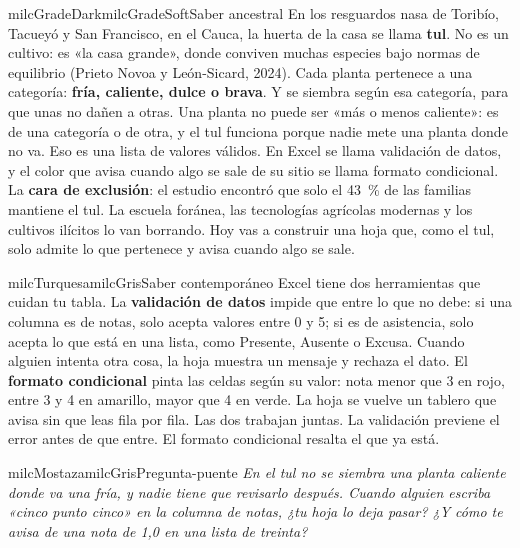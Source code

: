 \documentclass[11pt,letterpaper]{article}
\begin{document}
\begin{softbox}{milcGradeDark}{milcGradeSoft}{Saber ancestral}
En los resguardos nasa de Toribío, Tacueyó y San Francisco, en el Cauca, la huerta de la casa se llama \textbf{tul}. No es un cultivo: es «la casa grande», donde conviven muchas especies bajo normas de equilibrio (Prieto Novoa y León-Sicard, 2024). Cada planta pertenece a una categoría: \textbf{fría, caliente, dulce o brava}. Y se siembra según esa categoría, para que unas no dañen a otras. Una planta no puede ser «más o menos caliente»: es de una categoría o de otra, y el tul funciona porque nadie mete una planta donde no va. Eso es una lista de valores válidos. En Excel se llama validación de datos, y el color que avisa cuando algo se sale de su sitio se llama formato condicional. La \textbf{cara de exclusión}: el estudio encontró que solo el 43~\% de las familias mantiene el tul. La escuela foránea, las tecnologías agrícolas modernas y los cultivos ilícitos lo van borrando. Hoy vas a construir una hoja que, como el tul, solo admite lo que pertenece y avisa cuando algo se sale.\par{}
\end{softbox}

\begin{softbox}{milcTurquesa}{milcGris}{Saber contemporáneo}
Excel tiene dos herramientas que cuidan tu tabla. La \textbf{validación de datos} impide que entre lo que no debe: si una columna es de notas, solo acepta valores entre 0 y 5; si es de asistencia, solo acepta lo que está en una lista, como Presente, Ausente o Excusa. Cuando alguien intenta otra cosa, la hoja muestra un mensaje y rechaza el dato. El \textbf{formato condicional} pinta las celdas según su valor: nota menor que 3 en rojo, entre 3 y 4 en amarillo, mayor que 4 en verde. La hoja se vuelve un tablero que avisa sin que leas fila por fila. Las dos trabajan juntas. La validación previene el error antes de que entre. El formato condicional resalta el que ya está.
\end{softbox}

\begin{softbox}{milcMostaza}{milcGris}{Pregunta-puente}
\textit{En el tul no se siembra una planta caliente donde va una fría, y nadie tiene que revisarlo después. Cuando alguien escriba «cinco punto cinco» en la columna de notas, ¿tu hoja lo deja pasar? ¿Y cómo te avisa de una nota de 1,0 en una lista de treinta?}
\end{softbox}
\end{document}

